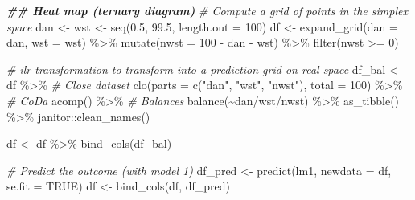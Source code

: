 \documentclass[
  12pt,
]{article}
\newenvironment{Shaded}{\begin{snugshade}}{\end{snugshade}}
\newcommand{\AttributeTok}[1]{\textcolor[rgb]{0.77,0.63,0.00}{#1}}
\newcommand{\CommentTok}[1]{\textcolor[rgb]{0.56,0.35,0.01}{\textit{#1}}}
\newcommand{\ConstantTok}[1]{\textcolor[rgb]{0.00,0.00,0.00}{#1}}
\newcommand{\DecValTok}[1]{\textcolor[rgb]{0.00,0.00,0.81}{#1}}
\newcommand{\DocumentationTok}[1]{\textcolor[rgb]{0.56,0.35,0.01}{\textbf{\textit{#1}}}}
\newcommand{\FloatTok}[1]{\textcolor[rgb]{0.00,0.00,0.81}{#1}}
\newcommand{\FunctionTok}[1]{\textcolor[rgb]{0.00,0.00,0.00}{#1}}
\newcommand{\NormalTok}[1]{#1}
\newcommand{\OtherTok}[1]{\textcolor[rgb]{0.56,0.35,0.01}{#1}}
\newcommand{\SpecialCharTok}[1]{\textcolor[rgb]{0.00,0.00,0.00}{#1}}
\newcommand{\StringTok}[1]{\textcolor[rgb]{0.31,0.60,0.02}{#1}}
\begin{document}
\begin{Shaded}
\begin{Highlighting}[]
\DocumentationTok{\#\# Heat map (ternary diagram)}
\CommentTok{\# Compute a grid of points in the simplex space}
\NormalTok{dan }\OtherTok{\textless{}{-}}\NormalTok{ wst }\OtherTok{\textless{}{-}} \FunctionTok{seq}\NormalTok{(}\FloatTok{0.5}\NormalTok{, }\FloatTok{99.5}\NormalTok{, }\AttributeTok{length.out =} \DecValTok{100}\NormalTok{)}
\NormalTok{df }\OtherTok{\textless{}{-}} \FunctionTok{expand\_grid}\NormalTok{(}\AttributeTok{dan =}\NormalTok{ dan, }\AttributeTok{wst =}\NormalTok{ wst) }\SpecialCharTok{\%\textgreater{}\%}  
  \FunctionTok{mutate}\NormalTok{(}\AttributeTok{nwst =} \DecValTok{100} \SpecialCharTok{{-}}\NormalTok{ dan }\SpecialCharTok{{-}}\NormalTok{ wst) }\SpecialCharTok{\%\textgreater{}\%} 
  \FunctionTok{filter}\NormalTok{(nwst }\SpecialCharTok{\textgreater{}=} \DecValTok{0}\NormalTok{)}

\CommentTok{\# ilr transformation to transform into a prediction grid on real space}
\NormalTok{df\_bal }\OtherTok{\textless{}{-}}\NormalTok{ df }\SpecialCharTok{\%\textgreater{}\%} 
  \CommentTok{\# Close dataset}
  \FunctionTok{clo}\NormalTok{(}\AttributeTok{parts =} \FunctionTok{c}\NormalTok{(}\StringTok{"dan"}\NormalTok{, }\StringTok{"wst"}\NormalTok{, }\StringTok{"nwst"}\NormalTok{),}
      \AttributeTok{total =} \DecValTok{100}\NormalTok{) }\SpecialCharTok{\%\textgreater{}\%} 
  \CommentTok{\# CoDa}
  \FunctionTok{acomp}\NormalTok{() }\SpecialCharTok{\%\textgreater{}\%} 
  \CommentTok{\# Balances}
  \FunctionTok{balance}\NormalTok{(}\SpecialCharTok{\textasciitilde{}}\NormalTok{dan}\SpecialCharTok{/}\NormalTok{wst}\SpecialCharTok{/}\NormalTok{nwst) }\SpecialCharTok{\%\textgreater{}\%}
  \FunctionTok{as\_tibble}\NormalTok{() }\SpecialCharTok{\%\textgreater{}\%}
\NormalTok{  janitor}\SpecialCharTok{::}\FunctionTok{clean\_names}\NormalTok{()}

\NormalTok{df }\OtherTok{\textless{}{-}}\NormalTok{ df }\SpecialCharTok{\%\textgreater{}\%} \FunctionTok{bind\_cols}\NormalTok{(df\_bal)}

\CommentTok{\# Predict the outcome (with model 1)}
\NormalTok{df\_pred }\OtherTok{\textless{}{-}} \FunctionTok{predict}\NormalTok{(lm1, }\AttributeTok{newdata =}\NormalTok{ df, }\AttributeTok{se.fit =} \ConstantTok{TRUE}\NormalTok{)}
\NormalTok{df }\OtherTok{\textless{}{-}} \FunctionTok{bind\_cols}\NormalTok{(df, df\_pred)}


\end{Highlighting}
\end{Shaded}
\end{document}

